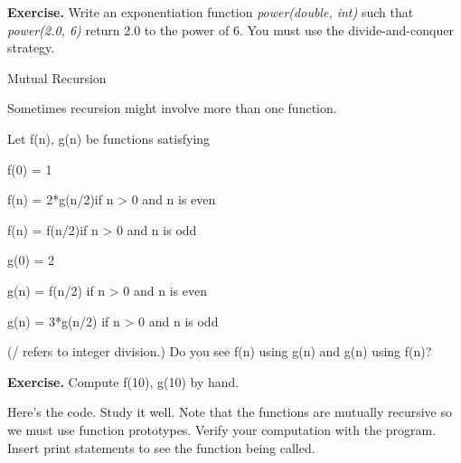 \documentclass[
]{article}
\begin{document}
\textbf{Exercise.} Write an exponentiation function \emph{power(double,
int)} such that \emph{power(2.0, 6)} return 2.0 to the power of 6. You
must use the divide-and-conquer strategy.

Mutual Recursion

Sometimes recursion might involve more than one function.

Let f(n), g(n) be functions satisfying

f(0) = 1

f(n) = 2*g(n/2)if n \textgreater{} 0 and n is even

f(n) = f(n/2)if n \textgreater{} 0 and n is odd

g(0) = 2

g(n) = f(n/2) if n \textgreater{} 0 and n is even

g(n) = 3*g(n/2) if n \textgreater{} 0 and n is odd

(/ refers to integer division.) Do you see f(n) using g(n) and g(n)
using f(n)?

\textbf{Exercise.} Compute f(10), g(10) by hand.

Here's the code. Study it well. Note that the functions are mutually
recursive so we must use function prototypes. Verify your computation
with the program. Insert print statements to see the function being
called.
\end{document}
